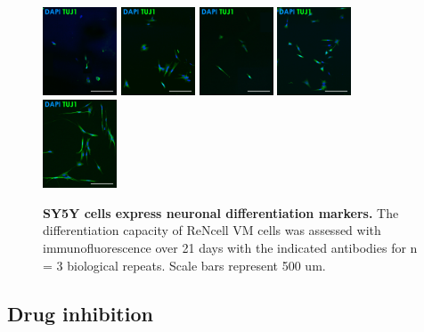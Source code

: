 \documentclass[onecolumn,10pt]{asme2ej}
\begin{document}
\begin{figure}[h]
	\includegraphics[width=0.196\textwidth]{figures/IF/SY5Y/d0-t}
	\includegraphics[width=0.196\textwidth]{figures/IF/SY5Y/d3-t}
	\includegraphics[width=0.196\textwidth]{figures/IF/SY5Y/d7-t.jpg}
	\includegraphics[width=0.196\textwidth]{figures/IF/SY5Y/d14-t}
	\includegraphics[width=0.196\textwidth]{figures/IF/SY5Y/d21-t}
	\caption{\textbf{SY5Y cells express neuronal differentiation markers.} The differentiation capacity of ReNcell VM cells was assessed with immunofluorescence over 21 days with the indicated antibodies for n = 3 biological repeats. Scale bars represent 500 um.}
	\label{diff-sy5y}
\end{figure}


\subsection{Drug inhibition}
\end{document}

